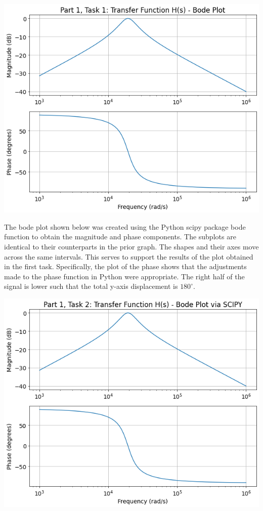 \documentclass[12pt]{report}
\begin{document}
\begin{center}
	\includegraphics[scale = 0.38]{Lab 10 - Plots/Part1-Task1.png}\\[0.5 cm]
\end{center}

The bode plot shown below was created using the Python scipy package bode function to obtain the magnitude and phase components. The subplots are identical to their counterparts in the prior graph. The shapes and their axes move across the same intervals. This serves to support the results of the plot obtained in the first task. Specifically, the plot of the phase shows that the adjustments made to the phase function in Python were appropriate. The right half of the signal is lower such that the total y-axis displacement is $ 180^\circ $. \\

\begin{center}
	\includegraphics[scale = 0.38]{Lab 10 - Plots/Part1-Task2.png}\\[1.0 cm]
\end{center}
\end{document}

